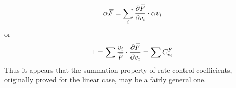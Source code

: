 $$ \alpha \,\overline{\!{F}} = \sum_i \frac{\partial \,\overline{\!{F}}}{\partial v_i} \cdot \alpha v_i $$
%
or
%
\begin{equation}
1 = \sum \frac{v_i}{\,\overline{\!{F}}} \cdot \frac{\partial \,\overline{\!{F}}}{\partial v_i} = \sum C_{v_i}^{\,\overline{\!{F}}} 
\label{eqn:131}
\end{equation}
%
Thus it appears that the summation property of rate control coefficients, originally proved for the linear case, may be a fairly general one.
